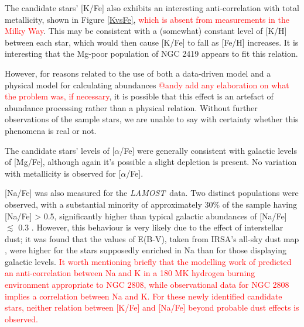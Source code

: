 \documentclass[a4paper,fleqn,usenatbib]{mnras}
\newcommand{\todo}[1]{\textcolor{red}{#1}}
\newcommand{\project}[1]{\emph{#1}}
\newcommand{\lamost}{\project{LAMOST}}
\begin{document}
The candidate stars' [K/Fe] also exhibits an interesting anti-correlation with total metallicity, shown in Figure \ref{KvsFe}, \todo{which is absent from measurements in the Milky Way}. This may be consistent with a (somewhat) constant level of [K/H] between each star, which would then cause [K/Fe] to fall as [Fe/H] increases. It is interesting that the Mg-poor population of NGC 2419 appears to fit this relation.

However, for reasons related to the use of both a data-driven model and a physical model for calculating abundances \todo{@andy add any elaboration on what the problem was, if necessary}, it is possible that this effect is an artefact of abundance processing rather than a physical relation. Without further observations of the sample stars, we are unable to say with certainty whether this phenomena is real or not.

The candidate stars' levels of [$\alpha$/Fe] were generally consistent with galactic levels of [Mg/Fe], although again it's possible a slight depletion is present. No variation with metallicity is observed for [$\alpha$/Fe].


[Na/Fe] was also measured for the \lamost\ data. Two distinct populations were observed, with a substantial minority of approximately 30\% of the sample having [Na/Fe] > 0.5, significantly higher than typical galactic abundances of [Na/Fe] $\lesssim$ 0.3 \citep{kobayashi2011}. However, this behaviour is very likely due to the effect of interstellar dust; it was found that the values of E(B-V), taken from IRSA's all-sky dust map \citep{schlafly2011}, were higher for the stars supposedly enriched in Na than for those displaying galactic levels. \todo{It worth mentioning briefly that the modelling work of \cite{prantzos2017} predicted an anti-correlation between Na and K in a 180 MK hydrogen burning environment appropriate to NGC 2808, while observational data for NGC 2808 implies a correlation between Na and K. For these newly identified candidate stars, neither relation between [K/Fe] and [Na/Fe] beyond probable dust effects is observed.}
\end{document}
